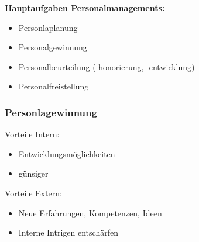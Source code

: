 \documentclass[../ZF_Wing.tex]{subfiles}
\begin{document}
\textbf{Hauptaufgaben Personalmanagements:}
\begin{itemize}
	\item Personlaplanung
	\item Personalgewinnung
	\item Personalbeurteilung (-honorierung, -entwicklung)
	\item Personalfreistellung
	
\end{itemize}


\subsubsection{Personlagewinnung}
Vorteile Intern:
\begin{itemize}
	\item Entwicklungsmöglichkeiten
	\item günsiger
\end{itemize}
Vorteile Extern:
\begin{itemize}
	\item Neue Erfahrungen, Kompetenzen, Ideen
	\item Interne Intrigen entschärfen
\end{itemize}
\end{document}
